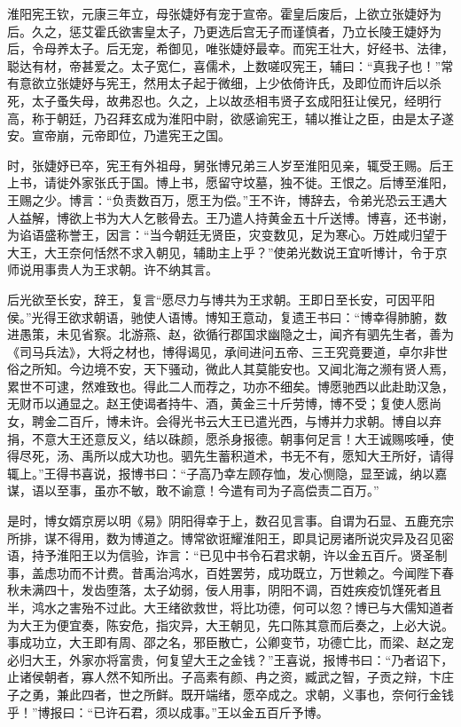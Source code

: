 \documentclass[12pt,UTF8]{ctexbook}
\begin{document}
淮阳宪王钦，元康三年立，母张婕妤有宠于宣帝。霍皇后废后，上欲立张婕妤为后。久之，惩艾霍氏欲害皇太子，乃更选后宫无子而谨慎者，乃立长陵王婕妤为后，令母养太子。后无宠，希御见，唯张婕妤最幸。而宪王壮大，好经书、法律，聪达有材，帝甚爱之。太子宽仁，喜儒术，上数嗟叹宪王，辅曰：“真我子也！”常有意欲立张婕妤与宪王，然用太子起于微细，上少依倚许氏，及即位而许后以杀死，太子蚤失母，故弗忍也。久之，上以故丞相韦贤子玄成阳狂让侯兄，经明行高，称于朝廷，乃召拜玄成为淮阳中尉，欲感谕宪王，辅以推让之臣，由是太子遂安。宣帝崩，元帝即位，乃遣宪王之国。



时，张婕妤已卒，宪王有外祖母，舅张博兄弟三人岁至淮阳见亲，辄受王赐。后王上书，请徙外家张氏于国。博上书，愿留守坟墓，独不徙。王恨之。后博至淮阳，王赐之少。博言：“负责数百万，愿王为偿。”王不许，博辞去，令弟光恐云王遇大人益解，博欲上书为大人乞骸骨去。王乃遣人持黄金五十斤送博。博喜，还书谢，为谄语盛称誉王，因言：“当今朝廷无贤臣，灾变数见，足为寒心。万姓咸归望于大王，大王奈何恬然不求入朝见，辅助主上乎？”使弟光数说王宜听博计，令于京师说用事贵人为王求朝。许不纳其言。



后光欲至长安，辞王，复言“愿尽力与博共为王求朝。王即日至长安，可因平阳侯。”光得王欲求朝语，驰使人语博。博知王意动，复遗王书曰：“博幸得肺腑，数进愚策，未见省察。北游燕、赵，欲循行郡国求幽隐之士，闻齐有驷先生者，善为《司马兵法》，大将之材也，博得谒见，承间进问五帝、三王究竟要道，卓尔非世俗之所知。今边境不安，天下骚动，微此人其莫能安也。又闻北海之濒有贤人焉，累世不可逮，然难致也。得此二人而荐之，功亦不细矣。博愿驰西以此赴助汉急，无财币以通显之。赵王使谒者持牛、酒，黄金三十斤劳博，博不受；复使人愿尚女，聘金二百斤，博未许。会得光书云大王已遣光西，与博并力求朝。博自以弃捐，不意大王还意反义，结以硃颜，愿杀身报德。朝事何足言！大王诚赐咳唾，使得尽死，汤、禹所以成大功也。驷先生蓄积道术，书无不有，愿知大王所好，请得辄上。”王得书喜说，报博书曰：“子高乃幸左顾存恤，发心恻隐，显至诚，纳以嘉谋，语以至事，虽亦不敏，敢不谕意！今遣有司为子高偿责二百万。”



是时，博女婿京房以明《易》阴阳得幸于上，数召见言事。自谓为石显、五鹿充宗所排，谋不得用，数为博道之。博常欲诳耀淮阳王，即具记房诸所说灾异及召见密语，持予淮阳王以为信验，诈言：“已见中书令石君求朝，许以金五百斤。贤圣制事，盖虑功而不计费。昔禹治鸿水，百姓罢劳，成功既立，万世赖之。今闻陛下春秋未满四十，发齿堕落，太子幼弱，佞人用事，阴阳不调，百姓疾疫饥馑死者且半，鸿水之害殆不过此。大王绪欲救世，将比功德，何可以忽？博已与大儒知道者为大王为便宜奏，陈安危，指灾异，大王朝见，先口陈其意而后奏之，上必大说。事成功立，大王即有周、邵之名，邪臣散亡，公卿变节，功德亡比，而梁、赵之宠必归大王，外家亦将富贵，何复望大王之金钱？”王喜说，报博书曰：“乃者诏下，止诸侯朝者，寡人然不知所出。子高素有颜、冉之资，臧武之智，子贡之辩，卞庄子之勇，兼此四者，世之所鲜。既开端绪，愿卒成之。求朝，义事也，奈何行金钱乎！”博报曰：“已许石君，须以成事。”王以金五百斤予博。
\end{document}
